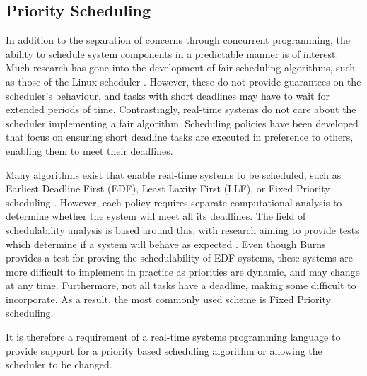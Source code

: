 \subsection{Priority Scheduling}
In addition to the separation of concerns through
concurrent programming, the ability to schedule system components in a
predictable manner is of interest. Much research has gone into the development
of fair scheduling algorithms, such as those of the Linux
scheduler \cite{6043273,7280991}. However, these do not provide guarantees on
the scheduler's behaviour, and tasks with short deadlines may have to wait for
extended periods of time. Contrastingly, real-time systems do not care about the
scheduler implementing a fair algorithm. Scheduling policies have been
developed that focus on ensuring short deadline tasks are executed in
preference to others, enabling them to meet their deadlines.
\par\bigskip\noindent
Many algorithms exist that enable real-time systems to be
scheduled, such as Earliest Deadline First (EDF), Least Laxity First (LLF), or
Fixed Priority scheduling \cite{real-time-systems}.  However, each policy
requires separate computational analysis to determine whether the
system will meet all its deadlines. The field of schedulability analysis is
based around this, with research aiming to provide tests which determine if a
system will behave as expected \cite{4815215,burns-sched-analysis}.  Even though 
Burns provides a test for proving the schedulability of EDF systems, these systems 
are more difficult to implement in practice as priorities are dynamic, and may change
at any time. Furthermore, not all tasks have a deadline, making some
difficult to incorporate. As a result, the most commonly used scheme is Fixed 
Priority scheduling. 
\par\bigskip\noindent
It is therefore a requirement of a real-time systems programming language to provide
support for a priority based scheduling algorithm or allowing the scheduler to
be changed. 

